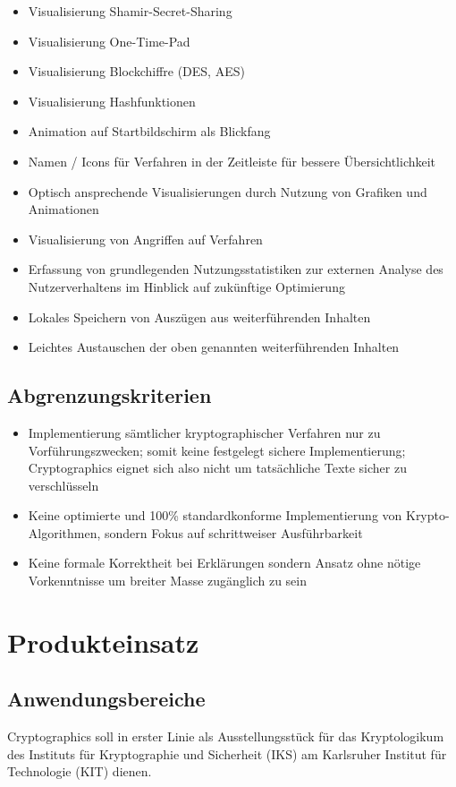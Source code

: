 \documentclass{article}
\begin{document}
\begin{itemize}
    \item Visualisierung Shamir-Secret-Sharing
    \item Visualisierung One-Time-Pad
    \item Visualisierung Blockchiffre (DES, AES)
    \item Visualisierung Hashfunktionen
    \item Animation auf Startbildschirm als Blickfang
    \item Namen / Icons für Verfahren in der Zeitleiste für bessere Übersichtlichkeit
    \item Optisch ansprechende Visualisierungen durch Nutzung von Grafiken und Animationen
    \item Visualisierung von Angriffen auf Verfahren
    \item Erfassung von grundlegenden Nutzungsstatistiken zur externen Analyse des Nutzerverhaltens im Hinblick auf zukünftige Optimierung
    \item Lokales Speichern von Auszügen aus weiterführenden Inhalten
    \item Leichtes Austauschen der oben genannten weiterführenden Inhalten
\end{itemize}

\subsection{Abgrenzungskriterien}
\begin{itemize}
	\item Implementierung sämtlicher kryptographischer Verfahren nur zu Vorführungszwecken; somit keine festgelegt sichere Implementierung; Cryptographics eignet sich also nicht um tatsächliche Texte sicher zu verschlüsseln
    \item Keine optimierte und 100\% standardkonforme Implementierung von Krypto-Algorithmen,
        sondern Fokus auf schrittweiser Ausführbarkeit
    \item Keine formale Korrektheit bei Erklärungen sondern Ansatz ohne nötige Vorkenntnisse
        um breiter Masse zugänglich zu sein
\end{itemize}

\section{Produkteinsatz}
\subsection{Anwendungsbereiche}
\gls{Cryptographics} soll in erster Linie als Ausstellungsstück für das \gls{Kryptologikum} des Instituts für Kryptographie und Sicherheit (\gls{IKS}) am Karlsruher Institut für Technologie (\gls{KIT}) dienen.
\end{document}

